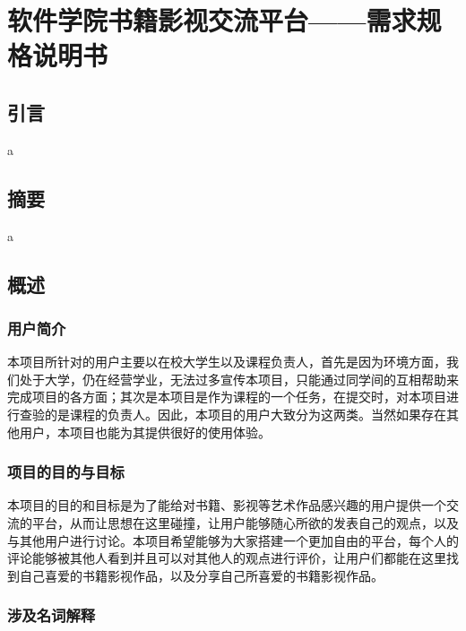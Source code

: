 \documentclass[
]{article}
\author{}
\date{}
\begin{document}
\hypertarget{header-n0}{%
\section{软件学院书籍影视交流平台------需求规格说明书}\label{header-n0}}

\hypertarget{header-n1369}{%
\subsection{引言}\label{header-n1369}}

a

\hypertarget{header-n1371}{%
\subsection{摘要}\label{header-n1371}}

a

\hypertarget{header-n1374}{%
\subsection{概述}\label{header-n1374}}

\hypertarget{header-n3}{%
\subsubsection{用户简介}\label{header-n3}}

本项目所针对的用户主要以在校大学生以及课程负责人，首先是因为环境方面，我们处于大学，仍在经营学业，无法过多宣传本项目，只能通过同学间的互相帮助来完成项目的各方面；其次是本项目是作为课程的一个任务，在提交时，对本项目进行查验的是课程的负责人。因此，本项目的用户大致分为这两类。当然如果存在其他用户，本项目也能为其提供很好的使用体验。

\hypertarget{header-n5}{%
\subsubsection{项目的目的与目标}\label{header-n5}}

本项目的目的和目标是为了能给对书籍、影视等艺术作品感兴趣的用户提供一个交流的平台，从而让思想在这里碰撞，让用户能够随心所欲的发表自己的观点，以及与其他用户进行讨论。本项目希望能够为大家搭建一个更加自由的平台，每个人的评论能够被其他人看到并且可以对其他人的观点进行评价，让用户们都能在这里找到自己喜爱的书籍影视作品，以及分享自己所喜爱的书籍影视作品。

\hypertarget{header-n7}{%
\subsubsection{涉及名词解释}\label{header-n7}}
\end{document}
